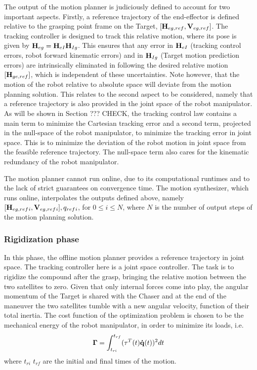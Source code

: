 The output of the motion planner is judiciously defined to account for two important aspects. Firstly, a reference trajectory of the end-effector is defined relative to the grasping point frame on the Target, $[\boldsymbol {\mathrm{H}}{}_{eg, ref}, \boldsymbol {\mathrm{V}}{}_{eg, ref}]$. The tracking controller is designed to track this relative motion, where its pose is given by $\boldsymbol {\mathrm{H}}{}_{eg}=\boldsymbol {\mathrm{H}}{}_{eI}\boldsymbol {\mathrm{H}}{}_{Ig}$. This ensures that any error in $\boldsymbol {\mathrm{H}}{}_{eI}$ (tracking control errors, robot forward kinematic errors) and in $\boldsymbol {\mathrm{H}}{}_{Ig}$ (Target motion prediction errors) are intrinsically eliminated in following the desired relative motion $[\boldsymbol {\mathrm{H}}{}_{ge, ref}]$, which is independent of these uncertainties. Note however, that the motion of the robot relative to absolute space will deviate from the motion planning solution. This relates to the second aspect to be considered, namely that a reference trajectory is also provided in the joint space of the robot manipulator. As will be shown in Section ??? CHECK, the tracking control law contains a main term to minimize the Cartesian tracking error and a second term, projected in the null-space of the robot manipulator, to minimize the tracking error in joint space. This is to minimize the deviation of the robot motion in joint space from the feasible reference trajectory. The null-space term also cares for the kinematic redundancy of the robot manipulator. 

The motion planner cannot run online, due to its computational runtimes and to the lack of strict guarantees on convergence time. The motion synthesizer, which runs online, interpolates the outputs defined above, namely $[\boldsymbol {\mathrm{H}}{}_{eg, ref}{}_{i}, \boldsymbol {\mathrm{V}}{}_{eg, ref}{}_{i}], q_{ref}{}_{i}$, for $0 \leq i\leq N$, where $N$ is the number of output steps of the motion planning solution. 
%
\subsubsection{Rigidization phase}
\label{sec:rigidization}
%
In this phase, the offline motion planner provides a reference trajectory in joint space. The  tracking controller here is a joint space controller. The task is to rigidize the compound after the grasp, bringing the relative motion between the two satellites to zero. Given that only internal forces come into play, the angular momentum of the Target is shared with the Chaser and at the end of the maneuver the two satellites tumble with a new angular velocity, function of their total inertia. The cost function of the optimization problem is chosen to be the mechanical energy of the robot manipulator, in order to minimize its loads, i.e.
\begin{equation}
\boldsymbol {\mathrm{\Gamma}} = \int^{t_{rf}}_{t_{ri}} (\tau {}^{T}(t) \boldsymbol {\mathrm{\dot{q}}}(t)){}^{2} dt
\label{eq:cost}
\end{equation}
where $t_{ri}$ $t_{rf}$ are the initial and final times of the motion. 

